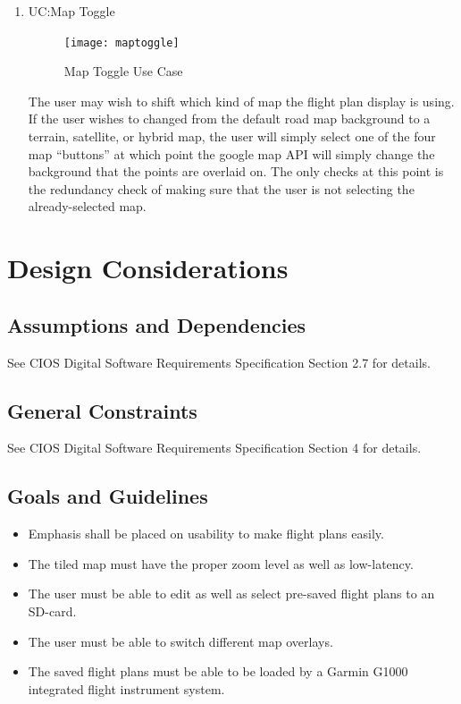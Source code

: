 \documentclass[12pt, letterpaper]{article}
\begin{document}
\begin{enumerate}
      \item UC:Map Toggle
	\begin{figure}[!ht]
		\caption{Map Toggle Use Case}
    		\centering
    		\texttt{[image: maptoggle]}
	\end{figure}
	The user may wish to shift which kind of map the flight plan display is using. If the user wishes to changed from the default road map background to a terrain, satellite, or hybrid map, the user will simply select one of the four map “buttons” at which point the google map API will simply change the background that the points are overlaid on. The only checks at this point is the redundancy check of making sure that the user is not selecting the already-selected map. 

    \end{enumerate}

\section{Design Considerations} \label{dsign}
  \subsection{Assumptions and Dependencies}
    See CIOS Digital Software Requirements Specification Section 2.7 for details.
  \subsection{General Constraints}
    See CIOS Digital Software Requirements Specification Section 4 for details.
  \subsection{Goals and Guidelines}
    \begin{itemize}
      \setlength{\itemsep}{1pt}
      \setlength{\parskip}{0pt}
      \setlength{\parsep}{0pt}
      \item Emphasis shall be placed on usability to make flight plans easily.
      \item The tiled map must have the proper zoom level as well as low-latency.
      \item The user must be able to edit as well as select pre-saved flight plans to an SD-card.
      \item The user must be able to switch different map overlays.
      \item The saved flight plans must be able to be loaded by a Garmin G1000 integrated flight instrument system.
    \end{itemize}
\end{document}
